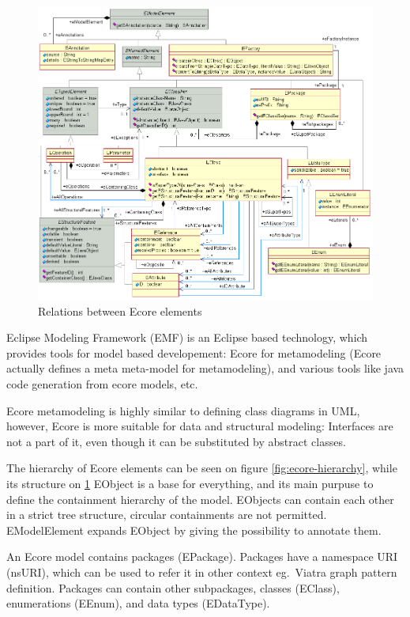 \begin{figure}
	\begin{center}
		\includegraphics[width=\textwidth]{figures/EcoreRelations.png}
		\caption{Relations between Ecore elements}
		\label{fig:ecore-relations}
	\end{center}
\end{figure}

Eclipse Modeling Framework (EMF) is an Eclipse based technology, which provides tools for model based developement: 
Ecore for metamodeling (Ecore actually defines a meta meta-model for metamodeling), and various tools like java code generation from ecore models, etc.

Ecore metamodeling is highly similar to defining class diagrams in UML, however, 
Ecore is more suitable for data and structural modeling: Interfaces are not a part of it, even though it can be substituted by abstract classes.

The hierarchy of Ecore elements can be seen on figure \ref{fig:ecore-hierarchy}, while its structure on \ref{fig:ecore-relations}
EObject is a base for everything, and its main purpuse to define the containment hierarchy of the model. 
EObjects can contain each other in a strict tree structure, circular containments are not permitted.
EModelElement expands EObject by giving the possibility to annotate them.

An Ecore model contains packages (EPackage). 
Packages have a namespace URI (nsURI), which can be used to refer it in other context eg.\ Viatra graph pattern definition.
Packages can contain other subpackages, classes (EClass), enumerations (EEnum), and data types (EDataType).

